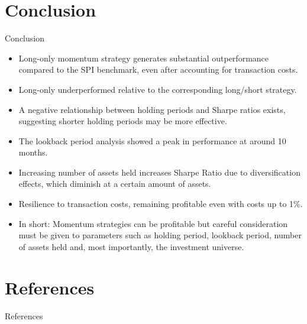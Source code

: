 \documentclass[10pt]{beamer}
\begin{document}
\section{Conclusion}
\begin{frame}{Conclusion}

\begin{itemize}
    \item Long-only momentum strategy generates substantial outperformance compared to the SPI benchmark, even after accounting for transaction costs.
    \item Long-only underperformed relative to the corresponding long/short strategy.
    \item A negative relationship between holding periods and Sharpe ratios exists, suggesting shorter holding periods may be more effective.
    \item The lookback period analysis showed a peak in performance at around 10 months. 
    \item Increasing number of assets held increases Sharpe Ratio due to diversification effects, which diminish at a certain amount of assets.
    \item Resilience to transaction costs, remaining profitable even with costs up to 1\%.  
    \item In short: Momentum strategies can be profitable but careful consideration must be given to parameters such as holding period, lookback period, number of assets held and, most importantly, the investment universe. 
\end{itemize}
\end{frame}

\section{References}
\begin{frame}{References}

\printbibliography


\end{frame}
\end{document}
